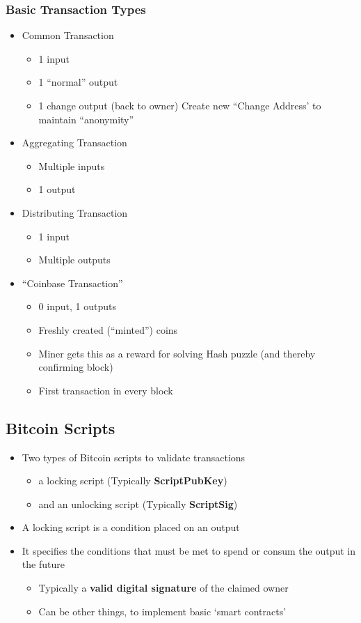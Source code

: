 \subsubsection{Basic Transaction Types}
\begin{itemize}
	\item Common Transaction
	\begin{itemize}
		\item 1 input
		\item 1 ``normal'' output
		\item 1 change output (back to owner)
		\subitem Create new ``Change Address' to maintain ``anonymity''
	\end{itemize}
	\item Aggregating Transaction
	\begin{itemize}
		\item Multiple inputs
		\item 1 output
	\end{itemize}
	\item Distributing Transaction
	\begin{itemize}
		\item 1 input
		\item Multiple outputs
	\end{itemize}
	\item ``Coinbase Transaction''
	\begin{itemize}
		\item 0 input, 1 outputs
		\item Freshly created (``minted'') coins
		\item Miner gets this as a reward for solving Hash puzzle (and thereby confirming block)
		\item First transaction in every block
	\end{itemize}
\end{itemize}

\subsection{Bitcoin Scripts}
\begin{itemize}
	\item Two types of Bitcoin scripts to validate transactions
	\begin{itemize}
		\item a locking script (Typically \textbf{ScriptPubKey})
		\item and an unlocking script (Typically \textbf{ScriptSig})
	\end{itemize}
	\item A locking script is a condition placed on an output
	\item It specifies the conditions that must be met to spend or consum the output in the future
	\begin{itemize}
		\item Typically a \textbf{valid digital signature} of the claimed owner
		\item Can be other things, to implement basic `smart contracts'
	\end{itemize}
\end{itemize}
